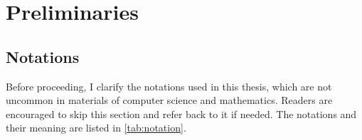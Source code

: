 \chapter{Preliminaries}\label{ch:Preliminaries}
\setcounter{figure}{0}


\section{Notations}\label{sec:notation}
Before proceeding, I clarify the notations used in this thesis, which are not uncommon in materials of computer science and mathematics. 
Readers are encouraged to skip this section and refer back to it if needed. 
The notations and their meaning are listed in \autoref{tab:notation}. 

